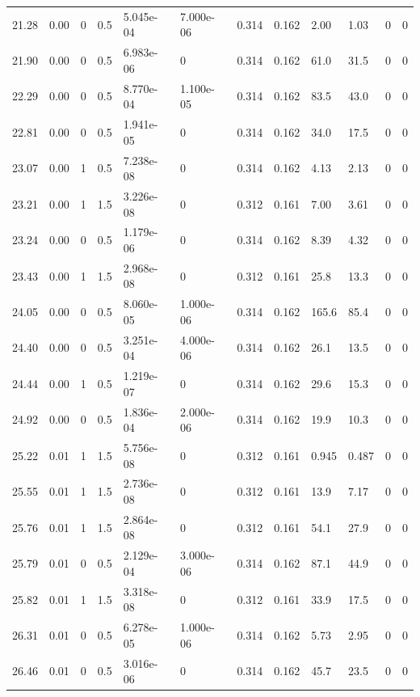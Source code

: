 \documentclass[preview]{standalone}
\begin{document}
{{{\begin{tabular}{L{1.2cm}C{1.2cm} C{0.3cm}C{0.5cm} C{1.4cm}C{1.4cm} C{1.4cm}C{1.4cm} C{1.6cm}C{1.6cm} C{1.6cm}C{1.6cm}}
  21.28  &  0.00  & 0     & 0.5 &  5.045e-04  & 7.000e-06  &  0.314&   0.162& 2.00 & 1.03   &  0 & 0  \\ 
  21.90  &  0.00  & 0     & 0.5 &  6.983e-06  & 0  &  0.314&   0.162& 61.0 & 31.5   &  0 & 0  \\ 
  22.29  &  0.00  & 0     & 0.5 &  8.770e-04  & 1.100e-05  &  0.314&   0.162& 83.5 & 43.0   &  0 & 0  \\ 
  22.81  &  0.00  & 0     & 0.5 &  1.941e-05  & 0  &  0.314&   0.162& 34.0 & 17.5   &  0 & 0  \\ 
  23.07  &  0.00  & 1     & 0.5 &  7.238e-08  & 0  &  0.314&   0.162& 4.13 & 2.13   &  0 & 0  \\ 
  23.21  &  0.00  & 1     & 1.5 &  3.226e-08  & 0  &  0.312&   0.161& 7.00 & 3.61   &  0 & 0  \\ 
  23.24  &  0.00  & 0     & 0.5 &  1.179e-06  & 0  &  0.314&   0.162& 8.39 & 4.32   &  0 & 0  \\ 
  23.43  &  0.00  & 1     & 1.5 &  2.968e-08  & 0  &  0.312&   0.161& 25.8 & 13.3   &  0 & 0  \\ 
  24.05  &  0.00  & 0     & 0.5 &  8.060e-05  & 1.000e-06  &  0.314&   0.162& 165.6 & 85.4   &  0 & 0  \\ 
  24.40  &  0.00  & 0     & 0.5 &  3.251e-04  & 4.000e-06  &  0.314&   0.162& 26.1 & 13.5   &  0 & 0  \\ 
  24.44  &  0.00  & 1     & 0.5 &  1.219e-07  & 0  &  0.314&   0.162& 29.6 & 15.3   &  0 & 0  \\ 
  24.92  &  0.00  & 0     & 0.5 &  1.836e-04  & 2.000e-06  &  0.314&   0.162& 19.9 & 10.3   &  0 & 0  \\ 
  25.22  &  0.01  & 1     & 1.5 &  5.756e-08  & 0  &  0.312&   0.161& 0.945 & 0.487   &  0 & 0  \\ 
  25.55  &  0.01  & 1     & 1.5 &  2.736e-08  & 0  &  0.312&   0.161& 13.9 & 7.17   &  0 & 0  \\ 
  25.76  &  0.01  & 1     & 1.5 &  2.864e-08  & 0  &  0.312&   0.161& 54.1 & 27.9   &  0 & 0  \\ 
  25.79  &  0.01  & 0     & 0.5 &  2.129e-04  & 3.000e-06  &  0.314&   0.162& 87.1 & 44.9   &  0 & 0  \\ 
  25.82  &  0.01  & 1     & 1.5 &  3.318e-08  & 0  &  0.312&   0.161& 33.9 & 17.5   &  0 & 0  \\ 
  26.31  &  0.01  & 0     & 0.5 &  6.278e-05  & 1.000e-06  &  0.314&   0.162& 5.73 & 2.95   &  0 & 0  \\ 
  26.46  &  0.01  & 0     & 0.5 &  3.016e-06  & 0  &  0.314&   0.162& 45.7 & 23.5   &  0 & 0  \\ 

\end{tabular}}}}
\end{document}
